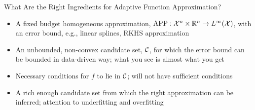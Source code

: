 \documentclass[10pt,compress,xcolor={usenames,dvipsnames},aspectratio=169]{beamer}
\DeclareMathOperator{\app}{APP}
\begin{document}
\vspace{-6ex}

\begin{frame}
	{What Are the Right Ingredients for Adaptive Function Approximation?}
	
	\begin{itemize}
		\item A fixed budget \alert{homogeneous approximation}, $\app : \cx^n \times \reals^n \to L^{\infty}(\cx)$, with an error bound, e.g., linear splines, RKHS approximation
		
		\item An unbounded, non-convex \alert{candidate set}, $\mathcal{C}$, for which the error bound can be bounded in \alert{data-driven} way; what you see is almost what you get
		
		\item \alert{Necessary} conditions for $f$ to lie in $\mathcal{C}$; will not have sufficient conditions
		
		\item A rich enough candidate set from which the right approximation can be \alert{inferred}; attention to underfitting and overfitting
		
			
	\end{itemize}




\end{frame}



\end{document}
